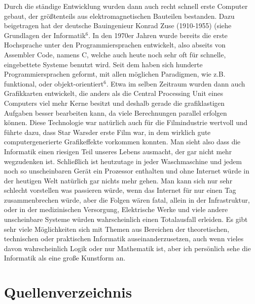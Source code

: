 \documentclass[12pt]{scrartcl}
\begin{document}
\newline
Durch die ständige Entwicklung wurden dann auch recht schnell erste Computer gebaut, der größtenteils aus elektromagnetischen Bauteilen bestanden. Dazu beigetragen hat der deutsche Bauingenieur Konrad Zuse (1910-1955) (siehe \glqq Grundlagen der Informatik\grqq$^6$.
\newline
In den 1970er Jahren wurde bereits die erste Hochsprache unter den Programmiersprachen entwickelt, also abseits von Assembler Code, namens \glqq C\grqq , welche auch heute noch sehr oft für schnelle, eingebettete Systeme benutzt wird. Seit dem haben sich hunderte Programmiersprachen geformt, mit allen möglichen Paradigmen, wie z.B. funktional, oder objekt-orientiert$^6$.
\newline
\newline
Etwa im selben Zeitraum wurden dann auch Grafikkarten entwickelt, die anders als die Central Processing Unit eines Computers viel mehr Kerne besitzt und deshalb gerade die grafiklastigen Aufgaben besser bearbeiten kann, da viele Berechnungen parallel erfolgen können. Diese Technologie war natürlich auch für die Filmindustrie wertvoll und führte dazu, dass \glqq Star Wars\grqq  der erste Film war, in dem wirklich gute computergenerierte Grafikeffekte vorkommen konnten.
\newline
\newline
Man sieht also dass die Informatik einen riesigen Teil unseres Lebens ausmacht, der gar nicht mehr wegzudenken ist. Schließlich ist heutzutage in jeder Waschmaschine und jedem noch so unscheinbaren Gerät ein Prozessor enthalten und ohne Internet würde in der heutigen Welt natürlich gar nichts mehr gehen. Man kann sich nur sehr schlecht vorstellen was passieren würde, wenn das Internet für nur einen Tag zusammenbrechen würde, aber die Folgen wären fatal, allein in der Infrastruktur, oder in der medizinischen Versorgung, Elektrische Werke und viele andere unscheinbare Systeme würden wahrscheinlich einen Totalausfall erleiden.
\newline
\newline
Es gibt sehr viele Möglichkeiten sich mit Themen aus Bereichen der theoretischen, technischen oder praktischen Informatik auseinanderzusetzen, auch wenn vieles davon wahrscheinlich Logik oder nur Mathematik ist, aber ich persönlich sehe die Informatik als eine große Kunstform an.

\newpage

\section{Quellenverzeichnis}
\end{document}
